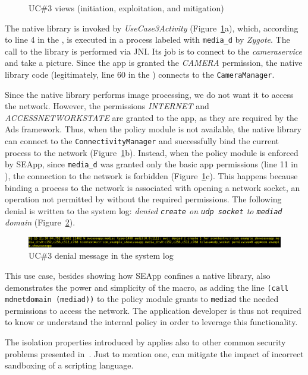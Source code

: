 \begin{figure}[h]
  \caption{\label{fig:seapp_uc3_views} UC\#3 views (initiation, exploitation, and mitigation)}
\end{figure}

The native library is invoked by {\em UseCase3Activity}
(Figure~\ref{fig:seapp_uc3_views}a), which, according to line 4 in the
\seappcontexts, is executed in a process labeled with {\tt media\_d}
by {\em Zygote}.  The call to the library is performed via JNI. Its
job is to connect to the {\em camera\textunderscore service} and take
a picture.  Since the app is granted the {\em CAMERA} permission, the
native library code (legitimately, line 60 in the \sepolicy) connects
to the {\tt CameraManager}.

Since the native library performs image processing, we do not want it
to access the network. However, the permissions {\em INTERNET} and
{\em ACCESS\textunderscore NETWORK\textunderscore STATE} are granted
to the app, as they are required by the Ads framework.  Thus, when the
policy module is not available, the native library can connect to the
{\tt ConnectivityManager} and successfully bind the current process to
the network (Figure~\ref{fig:seapp_uc3_views}b).  Instead, when the
policy module is enforced by SEApp, since {\tt media\_d} was granted
only the basic app permissions (line 11 in \sepolicy), the connection
to the network is forbidden (Figure~\ref{fig:seapp_uc3_views}c).  This
happens because binding a process to the network is associated with
opening a network socket, an operation not permitted by \sel without
the required permissions. The following denial is written to the
system log: {\em denied {\tt create} on {\tt udp\textunderscore
    socket} to {\tt media\textunderscore d} domain}
(Figure~\ref{fig:seapp_uc3_logcat}).

\begin{figure}[h]
  \centering
  \includegraphics[width=\textwidth]{chapters/seapp/figs/ae/uc35.png}
  \caption{\label{fig:seapp_uc3_logcat}  UC\#3 \sel denial message in the system log}
\end{figure}      

This use case, besides showing how SEApp confines a native library,
also demonstrates the power and simplicity of the macro, as adding the
line {\tt (call md\textunderscore netdomain (media\textunderscore d))}
to the policy module grants to {\tt media\textunderscore d} the needed
permissions to access the network.  The application developer is thus
not required to know or understand the internal \sel policy in order
to leverage this functionality.

The isolation properties introduced by \seapp applies also to other
common security problems presented
in~\cite{seapp_common_play_protect_vulnerabilites}. Just to mention
one, \seapp can mitigate the impact of incorrect sandboxing of a
scripting language.


